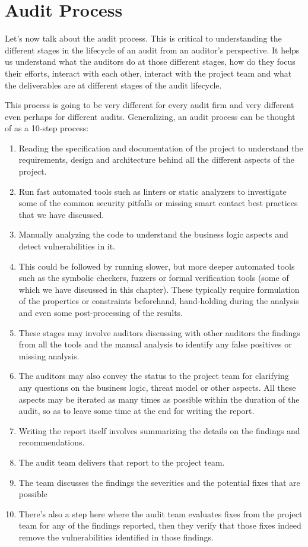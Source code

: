 \section{Audit Process}\label{audit-process}

Let's now talk about the audit process. This is critical to
understanding the different stages in the lifecycle of an audit from an
auditor's perspective. It helps us understand what the auditors do at
those different stages, how do they focus their efforts, interact with
each other, interact with the project team and what the deliverables are
at different stages of the audit lifecycle.

This process is going to be very different for every audit firm and very
different even perhaps for different audits. Generalizing, an audit
process can be thought of as a 10-step process:

\begin{enumerate}
\def\labelenumi{\arabic{enumi}.}
\item
  Reading the specification and documentation of the project to
  understand the requirements, design and architecture behind all the
  different aspects of the project.
\item
  Run fast automated tools such as linters or static analyzers to
  investigate some of the common security pitfalls or missing smart
  contact best practices that we have discussed.
\item
  Manually analyzing the code to understand the business logic aspects
  and detect vulnerabilities in it.
\item
  This could be followed by running slower, but more deeper automated
  tools such as the symbolic checkers, fuzzers or formal verification
  tools (some of which we have discussed in this chapter). These
  typically require formulation of the properties or constraints
  beforehand, hand-holding during the analysis and even some
  post-processing of the results.
\item
  These stages may involve auditors discussing with other auditors the
  findings from all the tools and the manual analysis to identify any
  false positives or missing analysis.
\item
  The auditors may also convey the status to the project team for
  clarifying any questions on the business logic, threat model or other
  aspects. All these aspects may be iterated as many times as possible
  within the duration of the audit, so as to leave some time at the end
  for writing the report.
\item
  Writing the report itself involves summarizing the details on the
  findings and recommendations.
\item
  The audit team delivers that report to the project team.
\item
  The team discusses the findings the severities and the potential fixes
  that are possible
\item
  There's also a step here where the audit team evaluates fixes from the
  project team for any of the findings reported, then they verify that
  those fixes indeed remove the vulnerabilities identified in those
  findings.
\end{enumerate}

